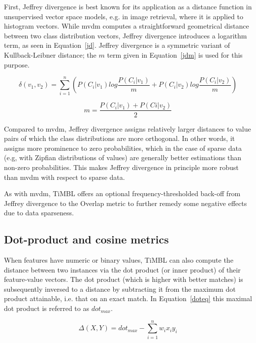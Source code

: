 \documentclass{book}
\begin{document}
First, Jeffrey divergence is best known for its application as a
distance function in unsupervised vector space models, e.g. in image
retrieval, where it is applied to histogram vectors. While {\sc mvdm}
computes a straightforward geometrical distance between two class
distribution vectors, Jeffrey divergence introduces a logarithm term,
as seen in Equation~\ref{jd}. Jeffrey divergence is a symmetric
variant of Kullback-Leibner distance; the $m$ term given in
Equation~\ref{jdm} is used for this purpose.

\begin{equation}
\delta(v_{1}, v_{2}) = \sum_{i=1}^{n} 
( P(C_{i}|v_{1}) log \frac{P(C_{i}|v_{1})}{m} +
  P(C_{i}|v_{2}) log \frac{P(C_{i}|v_{2})}{m} )
\label{jd}
\end{equation}

\begin{equation}
m = \frac{P(C_{i}|v_{1}) + P(C{i}|v_{2})}{2}
\label{jdm}
\end{equation}

Compared to {\sc mvdm}, Jeffrey divergence assigns relatively larger
distances to value pairs of which the class distributions are more
orthogonal. In other words, it assigns more prominence to zero
probabilities, which in the case of sparse data (e.g, with Zipfian
distributions of values) are generally better estimations than
non-zero probabilities. This makes Jeffrey divergence in principle
more robust than {\sc mvdm} with respect to sparse data.

As with {\sc mvdm}, TiMBL offers an optional frequency-thresholded
back-off from Jeffrey divergence to the Overlap metric to further
remedy some negative effects due to data sparseness.

\subsection{Dot-product and cosine metrics}
\label{dotproduct}

When features have numeric or binary values, TiMBL can also compute 
the distance between two instances via the dot product (or inner product) 
of their feature-value vectors. The dot product (which is higher with better 
matches) is subsequently inversed to a distance by subtracting it from 
the maximum dot product attainable, i.e. that on an exact match. In 
Equation~\ref{doteq} this maximal dot product is referred to as $dot_{max}$.

\begin{equation}
\label{doteq}
\Delta(X,Y) = dot_{max} - \sum_{i=1}^{n} w_{i} x_{i} y_{i}
\end{equation}
\end{document}
